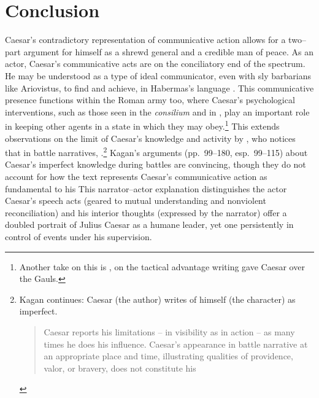 \documentclass[12pt,letterpaper,oneside,final]{memoir}
\begin{document}
\section{Conclusion}

Caesar's contradictory representation of communicative action allows for a two--part argument for himself as a shrewd general and a credible man of peace. As an actor, Caesar's communicative acts are on the conciliatory end of the spectrum. He may be understood as a type of ideal communicator, even with sly barbarians like Ariovistus, to find  and achieve, in Habermas's language . This communicative presence functions within the Roman army too, where Caesar's psychological interventions, such as those seen in the \emph{consilium} and in \textcite[patrolling soldiers' \emph{animus} and \emph{virtus}]{lendon1999}, play an important role in keeping other agents in a state in which they may obey.\footnote{Another take on this is \textcite[330--338]{osgood2009}, on the tactical advantage writing gave Caesar over the Gauls.} This extends observations on the limit of Caesar's knowledge and activity by \textcite{kagan2006}, who notices that in battle narratives, .\footnote{Kagan continues:  Caesar (the author) writes of himself (the character) as imperfect. \blockquote[{\cite[151]{kagan2006}}]{Caesar reports his limitations -- in visibility as in action -- as many times he does his influence. Caesar's appearance in battle narrative at an appropriate place and time, illustrating  qualities of providence, valor, or bravery, does not constitute his }.} Kagan's arguments (pp.~99--180, esp.~99--115) about Caesar's imperfect knowledge during battles are convincing, though they do not account for how the text represents Caesar's communicative action as fundamental to his  This narrator--actor explanation distinguishes the actor Caesar's speech acts (geared to mutual understanding and nonviolent reconciliation) and his interior thoughts (expressed by the narrator) offer a doubled portrait of Julius Caesar as a humane leader, yet one persistently in control of events under his supervision.

\end{document}
